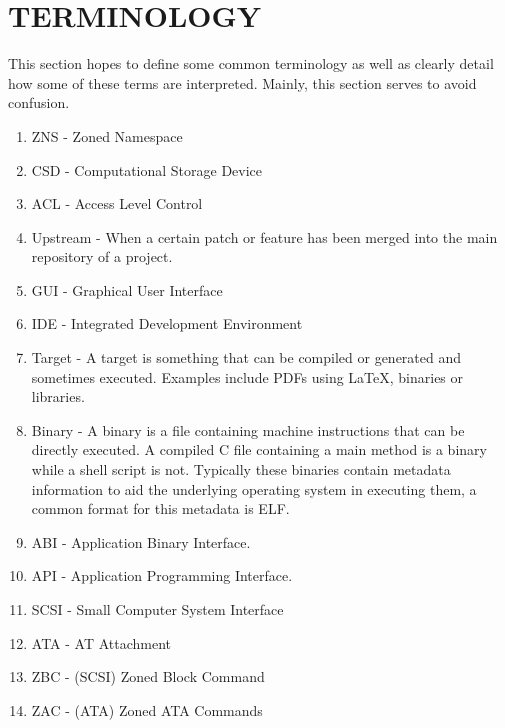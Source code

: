 \documentclass[conference]{IEEEtran}
\begin{document}
\section*{TERMINOLOGY} \label{term}

This section hopes to define some common terminology as well as clearly detail
how some of these terms are interpreted. Mainly, this section serves to avoid
confusion.

%

\begin{enumerate}
	\item ZNS - Zoned Namespace
	\item CSD - Computational Storage Device
	\item ACL - Access Level Control
	\item Upstream - When a certain patch or feature has been merged into the
					 main repository of a project.
	\item GUI - Graphical User Interface
	\item IDE - Integrated Development Environment
	\item Target - A target is something that can be compiled or generated and
					 sometimes executed. Examples include PDFs using LaTeX,
					 binaries or libraries.
	\item Binary   - A binary is a file containing machine instructions that can
					 be directly executed. A compiled C file containing a main
					 method is a binary while a shell script is not. Typically
					 these binaries contain metadata information to aid the
					 underlying operating system in executing them, a common
					 format for this metadata is ELF.
	\item ABI      - Application Binary Interface.
	\item API      - Application Programming Interface.
	\item SCSI     - Small Computer System Interface
	\item ATA      - AT Attachment
	\item ZBC      - (SCSI) Zoned Block Command
	\item ZAC      - (ATA) Zoned ATA Commands
\end{enumerate}
\end{document}
